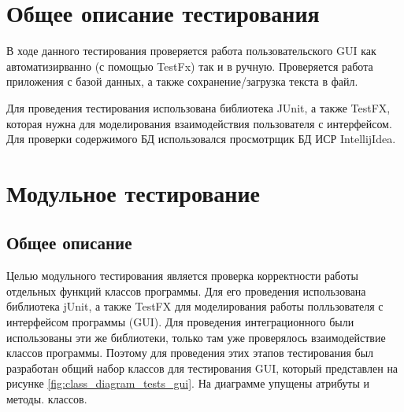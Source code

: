 \documentclass[a4paper,12pt]{article}
\begin{document}
\newpage\section{Общее описание тестирования}
В ходе данного тестирования проверяется работа пользовательского GUI как автоматизирванно (с помощью TestFx) так и в ручную. Проверяется работа приложения с базой данных, а также сохранение/загрузка текста в файл.

\par Для проведения тестирования использована библиотека JUnit, а также TestFX, которая нужна для моделирования взаимодействия пользователя с интерфейсом. Для проверки содержимого БД использовался просмотрщик БД ИСР IntellijIdea.

\newpage \section{Модульное тестирование}
\subsection{Общее описание}
Целью модульного тестирования является проверка корректности работы отдельных функций классов программы.
Для его проведения использована библиотека jUnit, а также TestFX для моделирования работы полльзователя с интерфейсом программы (GUI). Для проведения интеграционного были использованы эти же библиотеки, только там уже проверялось взаимодействие классов программы. Поэтому для проведения этих этапов тестирования был разработан общий набор классов для тестирования GUI, который представлен на рисунке \ref{fig:class_diagram_tests_gui}. На диаграмме упущены атрибуты и методы. классов.
\end{document}
